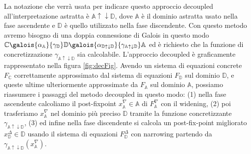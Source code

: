 La notazione che verrà usata per indicare questo approccio decoupled all'interpretazione astratta è \(\mathbb{A}\uparrow\downarrow\mathbb{D}\), dove \(\mathbb{A}\) è il dominio astratta usato nella fase ascendente e \(\mathbb{D}\) è quello utilizzato nella fase discendente. Con questo metodo avremo bisogno di una doppia connessione di Galois in questo modo \(\mathbb{C}\galois{\alpha_{\mathbb{A}}}{\gamma_{\mathbb{D}}}\mathbb{D}\galois{\alpha_{\mathbb{D}\uparrow\downarrow\mathbb{D}}}{\gamma_{\mathbb{A}\uparrow\downarrow\mathbb{D}}}\mathbb{A}\) ed è richiesto che la funzione di concretizzazione \(\gamma_{\mathbb{A}\uparrow\downarrow\mathbb{D}}\) sia calcolabile. L'approccio decoupled è graficamente rappresentato nella figura \ref{fig:decFig}. Avendo un sistema di equazioni concrete \(F_{\mathbb{C}}\) correttamente approssimato dal sistema di equazioni \(F_{\mathbb{D}}\) sul dominio \(\mathbb{D}\), e queste ultime ulteriormente approssimate da \(F_{\mathbb{A}}\) sul dominio \(\mathbb{A}\), possiamo riassumere i passaggi del metodo decoupled in questo modo: (1) nella fase ascendente calcoliamo il post-fixpoint \(x^{\nabla}_{\mathbb{A}}\in\mathbb{A}\) di \(F^{\nabla}_{\mathbb{A}}\) con il widening, (2) poi trasferiamo \(x^{\nabla}_{\mathbb{A}}\) nel dominio più preciso \(\mathbb{D}\) tramite la funzione concretizzante \(\gamma_{\mathbb{A}\uparrow\downarrow\mathbb{D}}\), (3) ed infine nella fase discendente si calcola un post-fix-point migliorato \(x^{\Delta}_{\mathbb{D}}\in\mathbb{D}\) usando il sistema di equazioni \(F^{\Delta}_{\mathbb{D}}\) con narrowing partendo da  \(\gamma_{\mathbb{A}\uparrow\downarrow\mathbb{D}}(x^{\nabla}_{\mathbb{A}})\).

